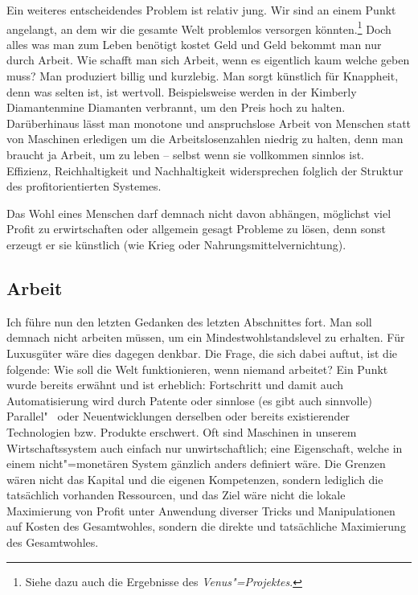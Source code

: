 Ein weiteres entscheidendes Problem ist relativ jung. Wir sind an einem Punkt angelangt, an dem wir die gesamte Welt problemlos versorgen könnten.\footnote{Siehe dazu auch die Ergebnisse des \textit{Venus"=Projektes}.} Doch alles was man zum Leben benötigt kostet Geld und Geld bekommt man nur durch Arbeit. Wie schafft man sich Arbeit, wenn es eigentlich kaum welche geben muss? Man produziert billig und kurzlebig. Man sorgt künstlich für Knappheit, denn was selten ist, ist wertvoll. Beispielsweise werden in der Kimberly Diamantenmine Diamanten verbrannt, um den Preis hoch zu halten. Darüberhinaus lässt man monotone und anspruchslose Arbeit von Menschen statt von Maschinen erledigen um die Arbeitslosenzahlen niedrig zu halten, denn man braucht ja Arbeit, um zu leben -- selbst wenn sie vollkommen sinnlos ist. Effizienz, Reichhaltigkeit und Nachhaltigkeit widersprechen folglich der Struktur des profitorientierten Systemes.

Das Wohl eines Menschen darf demnach nicht davon abhängen, möglichst viel Profit zu erwirtschaften oder allgemein gesagt Probleme zu lösen, denn sonst erzeugt er sie künstlich (wie Krieg oder Nahrungsmittelvernichtung).

\subsection{Arbeit}\label{sec:situation/work}

Ich führe nun den letzten Gedanken des letzten Abschnittes fort. Man soll demnach nicht arbeiten müssen, um ein Mindestwohlstandslevel zu erhalten. Für Luxusgüter wäre dies dagegen denkbar. Die Frage, die sich dabei auftut, ist die folgende: Wie soll die Welt funktionieren, wenn niemand arbeitet? Ein Punkt wurde bereits erwähnt und ist erheblich: Fortschritt und damit auch Automatisierung wird durch Patente oder sinnlose (es gibt auch sinnvolle) Parallel"~ oder Neuentwicklungen derselben oder bereits existierender Technologien bzw. Produkte erschwert. Oft sind Maschinen in unserem Wirtschaftssystem auch einfach nur unwirtschaftlich; eine Eigenschaft, welche in einem nicht"=monetären System gänzlich anders definiert wäre. Die Grenzen wären nicht das Kapital und die eigenen Kompetenzen, sondern lediglich die tatsächlich vorhanden Ressourcen, und das Ziel wäre nicht die lokale Maximierung von Profit unter Anwendung diverser Tricks und Manipulationen auf Kosten des Gesamtwohles, sondern die direkte und tatsächliche Maximierung des Gesamtwohles.


